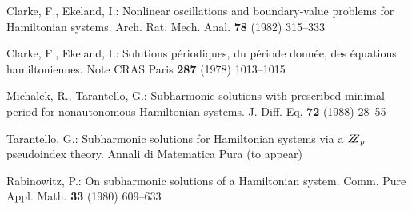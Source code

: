 \documentclass{itatnew}
\begin{document}
%
%
\begin{thebibliography}{5}
%
Clarke, F., Ekeland, I.:
Nonlinear oscillations and
boundary-value problems for Hamiltonian systems.
Arch. Rat. Mech. Anal. {\bf 78} (1982) 315--333

Clarke, F., Ekeland, I.:
Solutions p\'{e}riodiques, du
p\'{e}riode donn\'{e}e, des \'{e}quations hamiltoniennes.
Note CRAS Paris {\bf 287} (1978) 1013--1015

Michalek, R., Tarantello, G.:
Subharmonic solutions with prescribed minimal
period for nonautonomous Hamiltonian systems.
J. Diff. Eq. {\bf 72} (1988) 28--55

Tarantello, G.:
Subharmonic solutions for Hamiltonian
systems via a $\bbbz_{p}$ pseudoindex theory.
Annali di Matematica Pura (to appear)

Rabinowitz, P.:
On subharmonic solutions of a Hamiltonian system.
Comm. Pure Appl. Math. {\bf 33} (1980) 609--633


\end{thebibliography}
\end{document}
